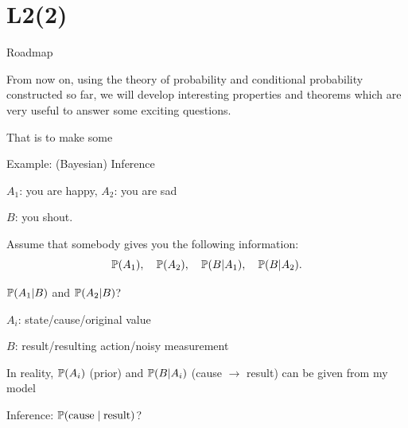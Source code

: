 \documentclass[fleqn,aspectratio=169]{beamer}
\begin{document}
\section{L2(2)}
\begin{frame}{Roadmap}

\bce[(1)]
\item {}

\item {}

\item {}

\ece
\end{frame}


\begin{frame}{}
\vspace{2cm}
\LARGE From now on, using the theory of probability and conditional probability constructed so far, we will develop interesting properties and theorems which are very useful to answer some exciting questions. 

\medskip

\LARGE That is  to make some 

\end{frame}

\begin{frame}{Example: (Bayesian) Inference}

{
\plitemsep 0.1in
\bci 

\item<2-> $A_1$: you are happy, $A_2$: you are sad
\item<2-> $B$: you shout. 

\item<4-> Assume that somebody gives you the following information:
$$
\mathbb{P}( A_1 ), \quad \mathbb{P}( A_2 ), \quad \mathbb{P}( B | A_1 ), \quad\mathbb{P}( B | A_2 ).
$$

\item<6->  $\mathbb{P}( A_1 | B )$ and $\mathbb{P}( A_2 | B )$?
\eci 
}
{
\plitemsep 0.1in
\bci 

\item<3-> $A_i$: state/cause/original value
\item<3-> $B$: result/resulting action/noisy measurement

\item<5-> In reality, $\mathbb{P}( A_i )$ (prior) and $\mathbb{P}( B | A_i )$ (cause $\rightarrow$ result) can be given from my model

\item<7-> Inference: $\mathbb{P}( \text{cause} \mid \text{result} )$?

\eci 
}

\medskip


\end{frame}
\end{document}
